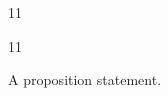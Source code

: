 \documentclass[paper=A4]{ropas-poster}
\begin{document}
\begin{postergrid}{1}{1}
\begin{posterblock}{1}{1}
\begin{proposition}A proposition statement.\end{proposition}
\end{posterblock}
\end{postergrid}
\end{document}
